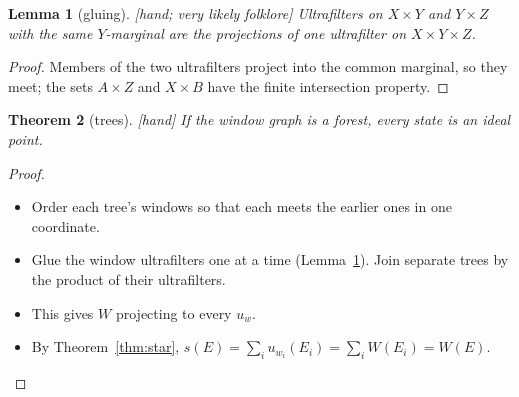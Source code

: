 \documentclass[11pt]{article}
\theoremstyle{plain}
\newtheorem{theorem}{Theorem}[section]
\newtheorem{lemma}[theorem]{Lemma}
\theoremstyle{definition}
\newcommand{\st}[1]{\textsf{\small[#1]}}
\begin{document}
\begin{lemma}[gluing]\label{lem:amalg}\st{hand; very likely folklore}
Ultrafilters on $X\times Y$ and $Y\times Z$ with the same $Y$-marginal are the
projections of one ultrafilter on $X\times Y\times Z$.
\end{lemma}
\begin{proof}
Members of the two ultrafilters project into the common marginal, so they meet;
the sets $A\times Z$ and $X\times B$ have the finite intersection property.
\end{proof}

\begin{theorem}[trees]\label{thm:path}\st{hand}
If the window graph is a forest, every state is an ideal point.
\end{theorem}
\begin{proof}
\begin{itemize}[nosep]
  \item Order each tree's windows so that each meets the earlier ones in one
    coordinate.
  \item Glue the window ultrafilters one at a time (Lemma~\ref{lem:amalg}). Join
    separate trees by the product of their ultrafilters.
  \item This gives $W$ projecting to every $u_w$.
  \item By Theorem~\ref{thm:star}, $s(E)=\sum_iu_{w_i}(E_i)=\sum_iW(E_i)=W(E)$.
\end{itemize}
\end{proof}
\end{document}

